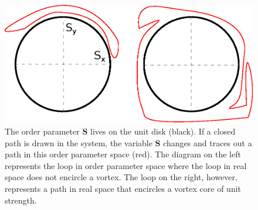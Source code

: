 \documentclass[a4paper,10pt]{article}
\newcommand{\bv}[1]{\mathbf{#1}}
\begin{document}
\begin{figure}
 \centering
 \includegraphics[scale=0.75]{topologicalspace.eps}
 \caption{The order parameter $\bv S$ lives on the unit disk (black). If a 
closed path is drawn in the system, the variable $\bv S$ changes and traces 
out a path in this order parameter space (red). The diagram on the left 
represents the loop in order parameter space where the loop in real space does 
not encircle a vortex. The loop on the right, however, represents a path in 
real space that encircles a vortex core of unit strength.}
\label{OPspace}
\end{figure}
\end{document}
